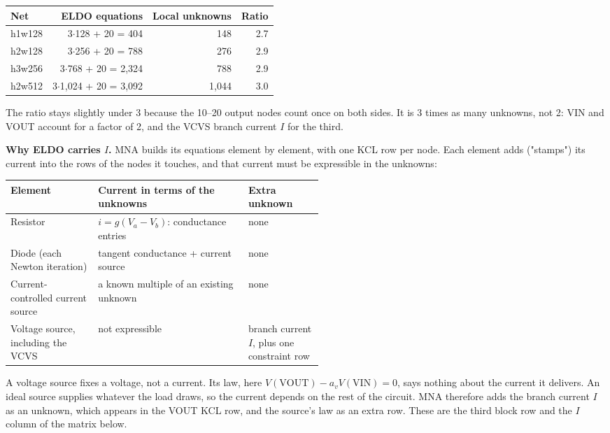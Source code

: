 \documentclass[11pt,a4paper]{article}
\begin{document}
\begin{center}
\small
\setlength{\tabcolsep}{4pt}
\begin{tabular}{@{}lrrr@{}}
\toprule
Net & ELDO equations & Local unknowns & Ratio \\
\midrule
h1w128 & 3\ensuremath{\cdot}128 + 20 = 404 & 148 & 2.7 \\
\addlinespace
h2w128 & 3\ensuremath{\cdot}256 + 20 = 788 & 276 & 2.9 \\
\addlinespace
h3w256 & 3\ensuremath{\cdot}768 + 20 = 2,324 & 788 & 2.9 \\
\addlinespace
h2w512 & 3\ensuremath{\cdot}1,024 + 20 = 3,092 & 1,044 & 3.0 \\
\bottomrule
\end{tabular}
\end{center}

The ratio stays slightly under 3 because the 10--20 output nodes count once on both
sides. It is 3 times as many unknowns, not 2: VIN and VOUT account for a factor of 2,
and the VCVS branch current $I$ for the third.

\textbf{Why ELDO carries $I$.} MNA builds its equations element by element, with one KCL
row per node. Each element adds ("stamps") its current into the rows of the nodes it
touches, and that current must be expressible in the unknowns:

\begin{center}
\small
\setlength{\tabcolsep}{4pt}
\begin{tabularx}{\linewidth}{@{}p{0.28\linewidth}X p{0.24\linewidth}@{}}
\toprule
Element & Current in terms of the unknowns & Extra unknown \\
\midrule
Resistor & $i=g(V_a-V_b)$: conductance entries & none \\
\addlinespace
Diode (each Newton iteration) & tangent conductance + current source & none \\
\addlinespace
Current-controlled current source & a known multiple of an existing unknown & none \\
\addlinespace
Voltage source, including the VCVS & not expressible & branch current $I$, plus one constraint row \\
\bottomrule
\end{tabularx}
\end{center}

A voltage source fixes a voltage, not a current. Its law, here
$V(\mathrm{VOUT})-a_vV(\mathrm{VIN})=0$, says nothing about the current it delivers. An
ideal source supplies whatever the load draws, so the current depends on the rest of the
circuit. MNA therefore adds the branch current $I$ as an unknown, which appears in the
VOUT KCL row, and the source's law as an extra row. These are the third block row and
the $I$ column of the matrix below.
\end{document}
